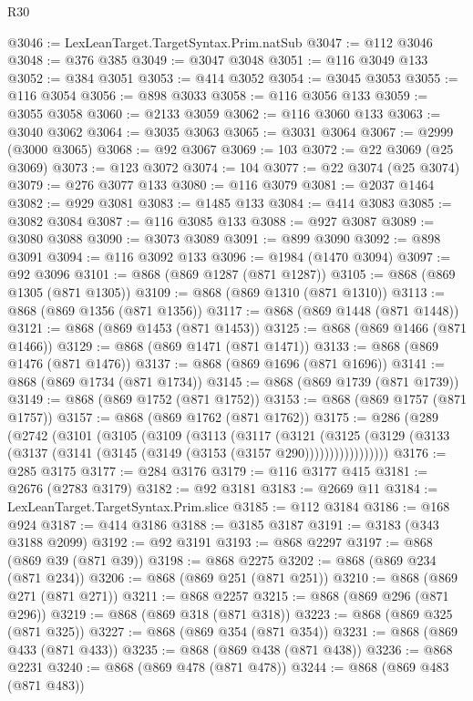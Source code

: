 \begin{lexlean}{R30}
\begin{coremodule}
@3046 := LexLeanTarget.TargetSyntax.Prim.natSub
@3047 := @112 @3046
@3048 := @376 @385
@3049 := @3047 @3048
@3051 := @116 @3049 @133
@3052 := @384 @3051
@3053 := @414 @3052
@3054 := @3045 @3053
@3055 := @116 @3054
@3056 := @898 @3033
@3058 := @116 @3056 @133
@3059 := @3055 @3058
@3060 := @2133 @3059
@3062 := @116 @3060 @133
@3063 := @3040 @3062
@3064 := @3035 @3063
@3065 := @3031 @3064
@3067 := @2999 (@3000 @3065)
@3068 := @92 @3067
@3069 := 103
@3072 := @22 @3069 (@25 @3069)
@3073 := @123 @3072
@3074 := 104
@3077 := @22 @3074 (@25 @3074)
@3079 := @276 @3077 @133
@3080 := @116 @3079
@3081 := @2037 @1464
@3082 := @929 @3081
@3083 := @1485 @133
@3084 := @414 @3083
@3085 := @3082 @3084
@3087 := @116 @3085 @133
@3088 := @927 @3087
@3089 := @3080 @3088
@3090 := @3073 @3089
@3091 := @899 @3090
@3092 := @898 @3091
@3094 := @116 @3092 @133
@3096 := @1984 (@1470 @3094)
@3097 := @92 @3096
@3101 := @868 (@869 @1287 (@871 @1287))
@3105 := @868 (@869 @1305 (@871 @1305))
@3109 := @868 (@869 @1310 (@871 @1310))
@3113 := @868 (@869 @1356 (@871 @1356))
@3117 := @868 (@869 @1448 (@871 @1448))
@3121 := @868 (@869 @1453 (@871 @1453))
@3125 := @868 (@869 @1466 (@871 @1466))
@3129 := @868 (@869 @1471 (@871 @1471))
@3133 := @868 (@869 @1476 (@871 @1476))
@3137 := @868 (@869 @1696 (@871 @1696))
@3141 := @868 (@869 @1734 (@871 @1734))
@3145 := @868 (@869 @1739 (@871 @1739))
@3149 := @868 (@869 @1752 (@871 @1752))
@3153 := @868 (@869 @1757 (@871 @1757))
@3157 := @868 (@869 @1762 (@871 @1762))
@3175 := @286
    (@289
      (@2742
        (@3101
          (@3105
            (@3109
              (@3113
                (@3117
                  (@3121
                    (@3125
                      (@3129 (@3133 (@3137 (@3141 (@3145 (@3149 (@3153 (@3157 @290)))))))))))))))))
@3176 := @285 @3175
@3177 := @284 @3176
@3179 := @116 @3177 @415
@3181 := @2676 (@2783 @3179)
@3182 := @92 @3181
@3183 := @2669 @11
@3184 := LexLeanTarget.TargetSyntax.Prim.slice
@3185 := @112 @3184
@3186 := @168 @924
@3187 := @414 @3186
@3188 := @3185 @3187
@3191 := @3183 (@343 @3188 @2099)
@3192 := @92 @3191
@3193 := @868 @2297
@3197 := @868 (@869 @39 (@871 @39))
@3198 := @868 @2275
@3202 := @868 (@869 @234 (@871 @234))
@3206 := @868 (@869 @251 (@871 @251))
@3210 := @868 (@869 @271 (@871 @271))
@3211 := @868 @2257
@3215 := @868 (@869 @296 (@871 @296))
@3219 := @868 (@869 @318 (@871 @318))
@3223 := @868 (@869 @325 (@871 @325))
@3227 := @868 (@869 @354 (@871 @354))
@3231 := @868 (@869 @433 (@871 @433))
@3235 := @868 (@869 @438 (@871 @438))
@3236 := @868 @2231
@3240 := @868 (@869 @478 (@871 @478))
@3244 := @868 (@869 @483 (@871 @483))

\end{coremodule}
\end{lexlean}
